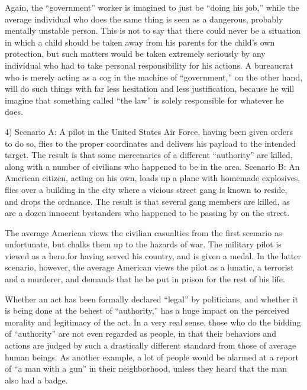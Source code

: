 \documentclass{book}
\begin{document}
Again, the \enquote{government} worker is imagined to just be \enquote{doing his job,} while the average individual who does the same thing is seen as a dangerous, probably mentally unstable person. This is not to say that there could never be a situation in which a child should be taken away from his parents for the child's own protection, but such matters would be taken extremely seriously by any individual who had to take personal responsibility for his actions. A bureaucrat who is merely acting as a cog in the machine of \enquote{government,} on the other hand, will do such things with far less hesitation and less justification, because he will imagine that something called \enquote{the law} is solely responsible for whatever he does.

4) Scenario A: A pilot in the United States Air Force, having been given orders to do so, flies to the proper coordinates and delivers his payload to the intended target. The result is that some mercenaries of a different \enquote{authority} are killed, along with a number of civilians who happened to be in the area. Scenario B: An American citizen, acting on his own, loads up a plane with homemade explosives, flies over a building in the city where a vicious street gang is known to reside, and drops the ordnance. The result is that several gang members are killed, as are a dozen innocent bystanders who happened to be passing by on the street.

The average American views the civilian casualties from the first scenario as unfortunate, but chalks them up to the hazards of war. The military pilot is viewed as a hero for having served his country, and is given a medal. In the latter scenario, however, the average American views the pilot as a lunatic, a terrorist and a murderer, and demands that he be put in prison for the rest of his life.

Whether an act has been formally declared \enquote{legal} by politicians, and whether it is being done at the behest of \enquote{authority,} has a huge impact on the perceived morality and legitimacy of the act. In a very real sense, those who do the bidding of \enquote{authority} are not even regarded as people, in that their behaviors and actions are judged by such a drastically different standard from those of average human beings. As another example, a lot of people would be alarmed at a report of \enquote{a man with a gun} in their neighborhood, unless they heard that the man also had a badge.
\end{document}
